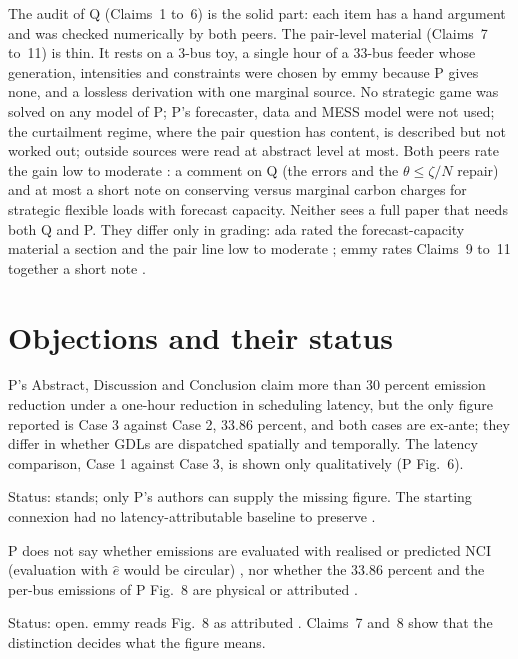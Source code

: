 \documentclass{article}
\begin{document}
The audit of Q (Claims~1 to~6) is the solid part: each item has a hand argument and was checked numerically by both peers. The pair-level material (Claims~7 to~11) is thin. It rests on a 3-bus toy, a single hour of a 33-bus feeder whose generation, intensities and constraints were chosen by emmy because P gives none, and a lossless derivation with one marginal source. No strategic game was solved on any model of P; P's forecaster, data and MESS model were not used; the curtailment regime, where the pair question has content, is described but not worked out; outside sources were read at abstract level at most. Both peers rate the gain low to moderate : a comment on Q (the errors and the \(\theta\le\zeta/N\) repair) and at most a short note on conserving versus marginal carbon charges for strategic flexible loads with forecast capacity. Neither sees a full paper that needs both Q and P. They differ only in grading: ada rated the forecast-capacity material a section  and the pair line low to moderate ; emmy rates Claims~9 to~11 together a short note .

\section{Objections and their status}

\begin{objection}
P's Abstract, Discussion and Conclusion claim more than 30 percent emission reduction under a one-hour reduction in scheduling latency, but the only figure reported is Case 3 against Case 2, 33.86 percent, and both cases are ex-ante; they differ in whether GDLs are dispatched spatially and temporally. The latency comparison, Case 1 against Case 3, is shown only qualitatively (P Fig.~6). 
\end{objection}
Status: stands; only P's authors can supply the missing figure. The starting connexion had no latency-attributable baseline to preserve .

\begin{objection}
P does not say whether emissions are evaluated with realised or predicted NCI (evaluation with \(\hat e\) would be circular) , nor whether the 33.86 percent and the per-bus emissions of P Fig.~8 are physical or attributed .
\end{objection}
Status: open. emmy reads Fig.~8 as attributed . Claims~7 and~8 show that the distinction decides what the figure means.
\end{document}
